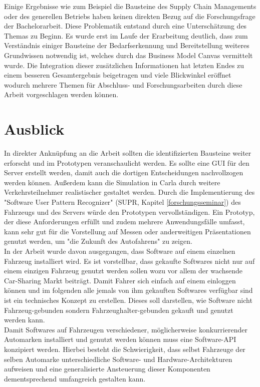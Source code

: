 Einige Ergebnisse wie zum Beispiel die Bausteine des Supply Chain Managements oder des generellen Betriebs haben keinen direkten Bezug auf die Forschungsfrage der Bachelorarbeit. Diese Problematik entstand durch eine Unterschätzung des Themas zu Beginn. Es wurde erst im Laufe der Erarbeitung deutlich, dass zum Verständnis einiger Bausteine der Bedarfserkennung und Bereitstellung weiteres Grundwissen notwendig ist, welches durch das Business Model Canvas vermittelt wurde. Die Integration dieser zusätzlichen Informationen hat letzten Endes zu einem besseren Gesamtergebnis beigetragen und viele Blickwinkel eröffnet wodurch mehrere Themen für Abschluss- und Forschungsarbeiten durch diese Arbeit vorgeschlagen werden können.\\

\section{Ausblick}
In direkter Anknüpfung an die Arbeit sollten die identifizierten Bausteine weiter erforscht und im Prototypen veranschaulicht werden. Es sollte eine GUI für den Server erstellt werden, damit auch die dortigen Entscheidungen nachvollzogen werden können. Außerdem kann die Simulation in Carla durch weitere Verkehrsteilnehmer realistischer gestaltet werden. Durch die Implementierung des "Software User Pattern Recognizer" (SUPR, Kapitel \ref{forschungsseminar}) des Fahrzeugs und des Servers würde den Prototypen vervollständigen. Ein Prototyp, der diese Anforderungen erfüllt und zudem mehrere Anwendungsfälle umfasst, kann sehr gut für die Vorstellung auf Messen oder anderweitigen Präsentationen genutzt werden, um "die Zukunft des Autofahrens" zu zeigen. \\

In der Arbeit wurde davon ausgegangen, dass Software auf einem einzelnen Fahrzeug installiert wird. Es ist vorstellbar, dass gekaufte Softwares nicht nur auf einem einzigen Fahrzeug genutzt werden sollen wozu vor allem der wachsende Car-Sharing Markt beiträgt. Damit Fahrer sich einfach auf einem einloggen können und im folgenden alle jemals von ihm gekauften Softwares verfügbar sind ist ein technisches Konzept zu erstellen. Dieses soll darstellen, wie Software nicht Fahrzeug-gebunden sondern Fahrzeughalter-gebunden gekauft und genutzt werden kann.\\
Damit Softwares auf Fahrzeugen verschiedener, möglicherweise konkurrierender Automarken  installiert und genutzt werden können muss eine Software-API konzipiert werden. Hierbei besteht die Schwierigkeit, dass selbst Fahrzeuge der selben Automarke unterschiedliche Software- und Hardware-Architekturen aufweisen und eine generalisierte Ansteuerung dieser Komponenten dementsprechend umfangreich gestalten kann.